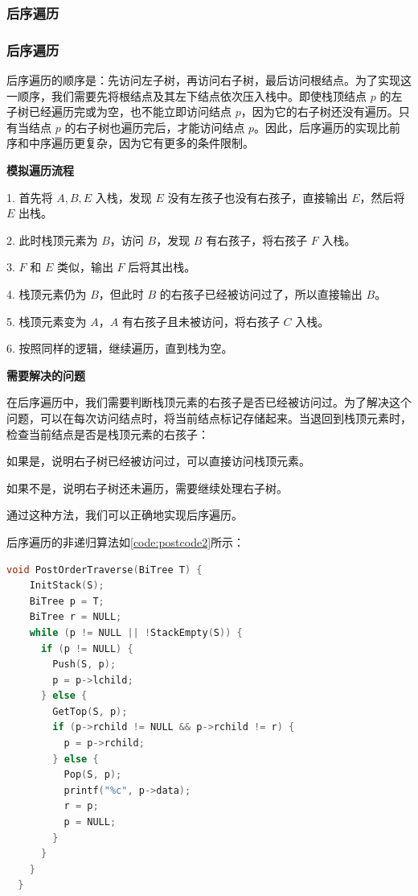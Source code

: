 \documentclass[lang=cn,newtx,10pt,scheme=chinese]{elegantbook}
\begin{document}
\subsubsection{后序遍历}
\subsubsection{后序遍历}

后序遍历的顺序是：先访问左子树，再访问右子树，最后访问根结点。为了实现这一顺序，我们需要先将根结点及其左下结点依次压入栈中。即使栈顶结点 $p$ 的左子树已经遍历完或为空，也不能立即访问结点 $p$，因为它的右子树还没有遍历。只有当结点 $p$ 的右子树也遍历完后，才能访问结点 $p$。因此，后序遍历的实现比前序和中序遍历更复杂，因为它有更多的条件限制。

\textbf{模拟遍历流程}

1. 首先将 $A, B, E$ 入栈，发现 $E$ 没有左孩子也没有右孩子，直接输出 $E$，然后将 $E$ 出栈。

2. 此时栈顶元素为 $B$，访问 $B$，发现 $B$ 有右孩子，将右孩子 $F$ 入栈。

3. $F$ 和 $E$ 类似，输出 $F$ 后将其出栈。

4. 栈顶元素仍为 $B$，但此时 $B$ 的右孩子已经被访问过了，所以直接输出 $B$。

5. 栈顶元素变为 $A$，$A$ 有右孩子且未被访问，将右孩子 $C$ 入栈。

6. 按照同样的逻辑，继续遍历，直到栈为空。

\textbf{需要解决的问题}

在后序遍历中，我们需要判断栈顶元素的右孩子是否已经被访问过。为了解决这个问题，可以在每次访问结点时，将当前结点标记存储起来。当退回到栈顶元素时，检查当前结点是否是栈顶元素的右孩子：

如果是，说明右子树已经被访问过，可以直接访问栈顶元素。

如果不是，说明右子树还未遍历，需要继续处理右子树。

通过这种方法，我们可以正确地实现后序遍历。

后序遍历的非递归算法如\ref{code:postcode2}所示：

\begin{lstlisting}[language=C++, caption={后序遍历}, label={code:postcode2}]
  void PostOrderTraverse(BiTree T) {
    InitStack(S);
    BiTree p = T;
    BiTree r = NULL;
    while (p != NULL || !StackEmpty(S)) {
      if (p != NULL) {
        Push(S, p);
        p = p->lchild;
      } else {
        GetTop(S, p);
        if (p->rchild != NULL && p->rchild != r) {
          p = p->rchild;
        } else {
          Pop(S, p);
          printf("%c", p->data);
          r = p;
          p = NULL;
        }
      }
    }
  }
\end{lstlisting}
\end{document}
